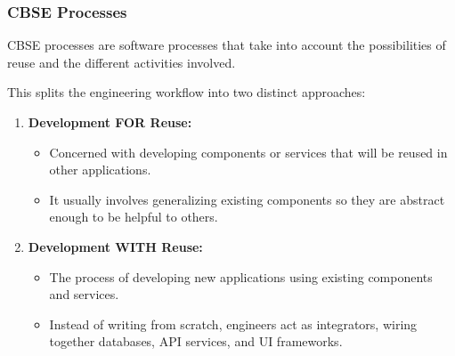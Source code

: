 \documentclass[xcolor=table]{beamer}
\begin{document}
\begin{frame}
    \frametitle{CBSE Processes}
    CBSE processes are software processes that take into account the possibilities of reuse and the different activities involved.
    
    \vspace{0.3cm}
    This splits the engineering workflow into two distinct approaches:
    
    \begin{enumerate}
        \item \textbf{Development FOR Reuse:}
        \begin{itemize}
            \item Concerned with developing components or services that will be reused in other applications.
            \item It usually involves generalizing existing components so they are abstract enough to be helpful to others.
        \end{itemize}
        \vspace{0.2cm}
        \item \textbf{Development WITH Reuse:}
        \begin{itemize}
            \item The process of developing new applications using existing components and services.
            \item Instead of writing from scratch, engineers act as integrators, wiring together databases, API services, and UI frameworks.
        \end{itemize}
    \end{enumerate}
\end{frame}



    
    
\end{document}
